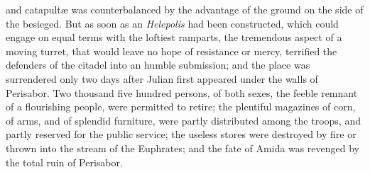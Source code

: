 and catapultæ was counterbalanced by the advantage of the ground
on the side of the besieged. But as soon as an \textit{Helepolis} had
been constructed, which could engage on equal terms with the
loftiest ramparts, the tremendous aspect of a moving turret, that
would leave no hope of resistance or mercy, terrified the
defenders of the citadel into an humble submission; and the place
was surrendered only two days after Julian first appeared under
the walls of Perisabor. Two thousand five hundred persons, of
both sexes, the feeble remnant of a flourishing people, were
permitted to retire; the plentiful magazines of corn, of arms,
and of splendid furniture, were partly distributed among the
troops, and partly reserved for the public service; the useless
stores were destroyed by fire or thrown into the stream of the
Euphrates; and the fate of Amida was revenged by the total ruin
of Perisabor.


